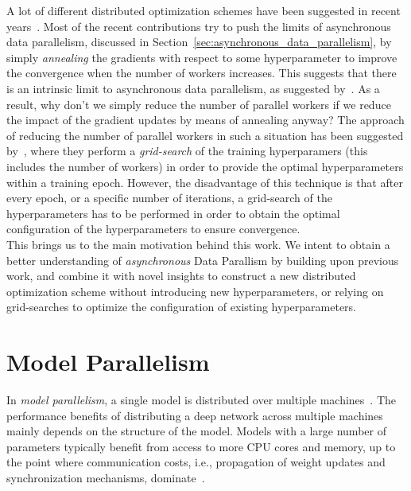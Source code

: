 A lot of different distributed optimization schemes have been suggested in recent years~\cite{zhang2015deep, dean2012large, hadjis2016omnivore}. Most of the recent contributions try to push the limits of asynchronous data parallelism, discussed in Section~\ref{sec:asynchronous_data_parallelism}, by simply \emph{annealing} the gradients with respect to some hyperparameter to improve the convergence when the number of workers increases. This suggests that there is an intrinsic limit to asynchronous data parallelism, as suggested by~\cite{implicitmomentum}. As a result, why don't we simply reduce the number of parallel workers if we reduce the impact of the gradient updates by means of annealing anyway? The approach of reducing the number of parallel workers in such a situation has been suggested by~\cite{hadjis2016omnivore}, where they perform a \emph{grid-search} of the training hyperparamers (this includes the number of workers) in order to provide the optimal hyperparameters within a training epoch. However, the disadvantage of this technique is that after every epoch, or a specific number of iterations, a grid-search of the hyperparameters has to be performed in order to obtain the optimal configuration of the hyperparameters to ensure convergence.\\

This brings us to the main motivation behind this work. We intent to obtain a better understanding of \emph{asynchronous} Data Parallism by building upon previous work, and combine it with novel insights to construct a new distributed optimization scheme without introducing new hyperparameters, or relying on grid-searches to optimize the configuration of existing hyperparameters.

\section{Model Parallelism}
\label{sec:intro_model_parallelism}

In \emph{model parallelism}, a single model is distributed over multiple machines~\cite{dean2012large}. The performance benefits of distributing a deep network across multiple machines mainly depends on the structure of the model. Models with a large number of parameters typically benefit from access to more CPU cores and memory, up to the point where communication costs, i.e., propagation of weight updates and synchronization mechanisms, dominate~\cite{dean2012large}.\\

